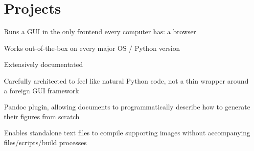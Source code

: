\section{Projects}

\begin{tightemize}
\item Runs a GUI in the only frontend every computer has: a browser
\item Works out-of-the-box on every major OS / Python version
\item Extensively documentated
\item Carefully architected to feel like natural Python code, not a thin wrapper around a foreign GUI framework
\end{tightemize}

\sectionsep

\begin{tightemize}
\item Pandoc plugin, allowing documents to programmatically describe how to generate their figures from scratch
\item Enables standalone text files to compile supporting images without accompanying files/scripts/build processes
\end{tightemize}
\sectionsep
